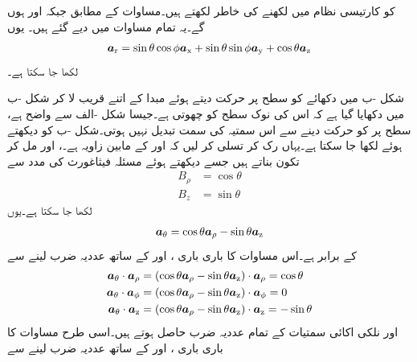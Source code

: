  کو کارتیسی نظام میں لکھنے کی خاطر  لکھتے ہیں۔مساوات  کے مطابق  جبکہ  اور  ہوں گے۔یہ تمام  مساوات  میں دیے گئے ہیں۔ یوں 
\begin{align}
{\boldsymbol{a}}_{\textup{r}}=\sin \theta \cos \phi {\boldsymbol{a}}_{\textup{x}}+\sin \theta \sin \phi {\boldsymbol{a}}_{\textup{y}}+\cos \theta {\boldsymbol{a}}_{\textup{z}}
\end{align}
لکھا جا سکتا ہے۔

شکل -ب میں دکھائے  کو  سطح پر حرکت دیتے ہوئے  مبدا کے اتنے قریب لا کر شکل -ب میں دکھایا گیا ہے کہ اس کی نوک  سطح کو چھوتی ہے۔جیسا شکل -الف سے واضح ہے،   سطح پر  کو حرکت دینے سے اس سمتیہ کی سمت تبدیل نہیں ہوتی۔شکل -ب کو دیکھتے ہوئے  لکھا جا سکتا ہے۔یہاں رک کر  تسلی کر لیں کہ  اور  کے مابین زاویہ  ہے۔،  اور  مل کر تکون بناتے ہیں جسے دیکھتے ہوئے مسئلہ فیثاغورث کی مدد سے
\begin{align*}
B_\rho&=\cos \theta\\
B_z&=\sin \theta
\end{align*}
لکھا جا سکتا ہے۔یوں
\begin{align}\label{مساوات_سمتیہ_کروی_اکائی_تھیٹا}
{\boldsymbol{a}}_{\theta}=\cos \theta {\boldsymbol{a}}_{\rho}-\sin \theta {\boldsymbol{a}}_{\textup{z}}
\end{align}
کے برابر ہے۔اس مساوات کا باری باری ،  اور  کے ساتھ عددیہ ضرب لینے سے
\begin{gather}
\begin{aligned}\label{مساوات_سمتیہ_کروی_تھیٹا_نلکی_اکائی_غیر_سمتی_ضرب}
{\boldsymbol{a}}_{\theta} \cdot {\boldsymbol{a}}_{\rho}&=(\cos \theta {\boldsymbol{a}}_{\rho}-\sin \theta {\boldsymbol{a}}_{\textup{z}}) \cdot {\boldsymbol{a}}_{\rho}=\cos \theta\\
{\boldsymbol{a}}_{\theta} \cdot {\boldsymbol{a}}_{\phi}&=(\cos \theta {\boldsymbol{a}}_{\rho}-\sin \theta {\boldsymbol{a}}_{\textup{z}}) \cdot {\boldsymbol{a}}_{\phi}=0\\
{\boldsymbol{a}}_{\theta} \cdot {\boldsymbol{a}}_{\textup{z}}&=(\cos \theta {\boldsymbol{a}}_{\rho}-\sin \theta {\boldsymbol{a}}_{\textup{z}}) \cdot {\boldsymbol{a}}_{\textup{z}}=-\sin \theta
\end{aligned}
\end{gather}
 اور نلکی اکائی سمتیات کے  تمام عددیہ ضرب حاصل ہوتے ہیں۔اسی طرح مساوات  کا باری باری ،  اور  کے ساتھ عددیہ ضرب لینے سے
